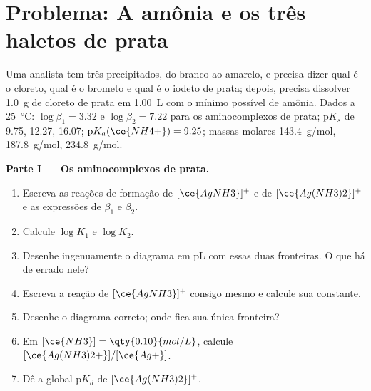 \section{Problema: A amônia e os três haletos de prata}

\begin{problem}
\label{pb:b1:complexation:1}
Uma analista tem três precipitados, do branco ao amarelo, e precisa
dizer qual é o cloreto, qual é o brometo e qual é o iodeto de prata;
depois, precisa dissolver \qty{1.0}{g} de cloreto de prata em
\qty{1.00}{L} com o mínimo possível de amônia. Dados a
\qty{25}{\celsius}: $\log\beta_1 = 3.32$ e
$\log\beta_2 = 7.22$ para os aminocomplexos de prata; $\mathrm{p}K_s$ de
 9.75,  12.27,  16.07;
$\mathrm{p}K_a(\ce{NH4+}) = 9.25$; massas molares 
\qty{143.4}{g/mol},  \qty{187.8}{g/mol},
 \qty{234.8}{g/mol}.

\medskip
\noindent\textbf{Parte I --- Os aminocomplexos de prata.}
\begin{enumerate}
  \item Escreva as reações de formação de $[\ce{AgNH3}]^{+}$ e de
        $[\ce{Ag(NH3)2}]^{+}$ e as expressões de $\beta_1$ e $\beta_2$.
  \item Calcule $\log K_1$ e $\log K_2$.
  \item Desenhe ingenuamente o diagrama em pL com essas duas fronteiras.
        O que há de errado nele?
  \item Escreva a reação de $[\ce{AgNH3}]^{+}$ consigo mesmo e calcule
        sua constante.
  \item Desenhe o diagrama correto; onde fica sua única fronteira?
  \item Em $[\ce{NH3}] = \qty{0.10}{mol/L}$, calcule
        $[\ce{Ag(NH3)2+}]/[\ce{Ag+}]$.
  \item Dê a  global $\mathrm{p}K_d$ de
        $[\ce{Ag(NH3)2}]^{+}$.
\end{enumerate}


\end{problem}
